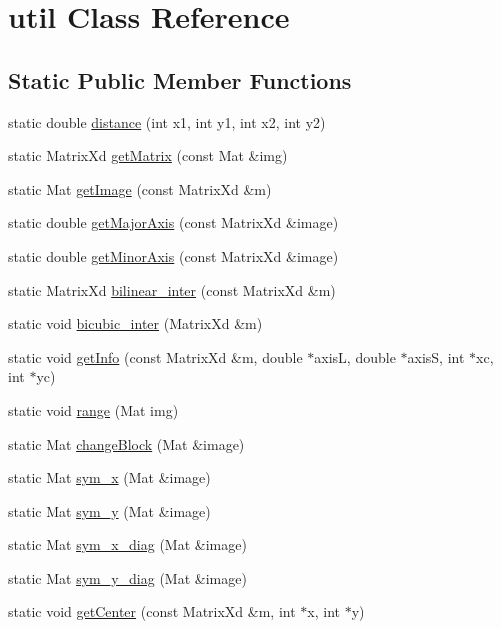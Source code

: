 \hypertarget{classutil}{}\section{util Class Reference}
\label{classutil}
\subsection*{Static Public Member Functions}
\begin{DoxyCompactItemize}
\item 
static double \hyperlink{classutil_a596403b6f926d79b5b255396442b0448}{distance} (int x1, int y1, int x2, int y2)
\item 
static Matrix\+Xd \hyperlink{classutil_a7985ee9ed77de47b0c30d6aae75c2ad7}{get\+Matrix} (const Mat \&img)
\item 
static Mat \hyperlink{classutil_a3bbdcf525b1e82a0557947fe0ef06188}{get\+Image} (const Matrix\+Xd \&m)
\item 
static double \hyperlink{classutil_ab4b1ca89e5931a845f0e5d9185508933}{get\+Major\+Axis} (const Matrix\+Xd \&image)
\item 
static double \hyperlink{classutil_afb1db2e9eba293d95574f08888747d29}{get\+Minor\+Axis} (const Matrix\+Xd \&image)
\item 
static Matrix\+Xd \hyperlink{classutil_ac5a3b3d50d093f41004cee793d624366}{bilinear\+\_\+inter} (const Matrix\+Xd \&m)
\item 
static void \hyperlink{classutil_a5042968702f7b3fe630935196f4d2bd8}{bicubic\+\_\+inter} (Matrix\+Xd \&m)
\item 
static void \hyperlink{classutil_a8abde4f7c16c31c85c05bd50d9e7a934}{get\+Info} (const Matrix\+Xd \&m, double $\ast$axisL, double $\ast$axisS, int $\ast$xc, int $\ast$yc)
\item 
static void \hyperlink{classutil_a7ff4ea2cfaaeafdec381a118eb25eab1}{range} (Mat img)
\item 
static Mat \hyperlink{classutil_acfaa3a9a9e5ab46dd12c785cb2530b16}{change\+Block} (Mat \&image)
\item 
static Mat \hyperlink{classutil_aba189e1b9b704f57998f38d78cf47a2a}{sym\+\_\+x} (Mat \&image)
\item 
static Mat \hyperlink{classutil_a075caed587185e920fab9e391e10be04}{sym\+\_\+y} (Mat \&image)
\item 
static Mat \hyperlink{classutil_a731556c9de6b8d77ecd6f456e73de6b8}{sym\+\_\+x\+\_\+diag} (Mat \&image)
\item 
static Mat \hyperlink{classutil_a9aec2603ab4ad8304d711fc58c4a6a4d}{sym\+\_\+y\+\_\+diag} (Mat \&image)
\item 
static void \hyperlink{classutil_a2f60474ad08d79e547208311a53760d0}{get\+Center} (const Matrix\+Xd \&m, int $\ast$x, int $\ast$y)
\end{DoxyCompactItemize}
